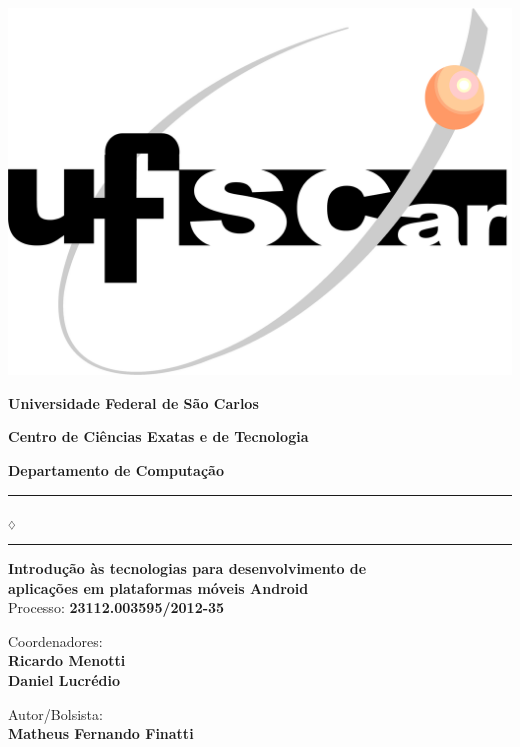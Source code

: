
\begin{center}

\begin{minipage}[c]{\textwidth}
  \parbox[c]{3cm}{
      \begin{flushright}
      \includegraphics[width=.25\textwidth]{../figuras/LogoUfscar}
      \end{flushright}
  }
  \parbox[c]{12cm}
    {
      \begin{center}
      \textbf{\Large Universidade Federal de São Carlos}

      \vspace{0.07cm}

      \textbf{\large Centro de Ciências Exatas e de Tecnologia}

      \vspace{0.07cm}

      \textbf{\large Departamento de Computação}
      \vspace{0.07cm}
      \end{center}
    }
\end{minipage}

\vspace{-0.5cm}
\rule{7.5cm}{0.03pc}{\tiny $_\diamondsuit$}\rule{7.5cm}{0.03pc}

\vspace*{20ex}

\textbf{\Large {Introdução às tecnologias para desenvolvimento de \\ aplicações em plataformas móveis Android}} \\
\large{ Processo: \textbf{23112.003595/2012-35}}

\vspace*{5ex}

{\Large{ Coordenadores:  }} \\
\textbf{\Large{ Ricardo Menotti}} \\
\textbf{\Large{ Daniel Lucrédio}}

\vspace*{5ex}

{\Large{ Autor/Bolsista:  }}  \\
\textbf{\Large{ Matheus Fernando Finatti }}  \\


\end{center}
